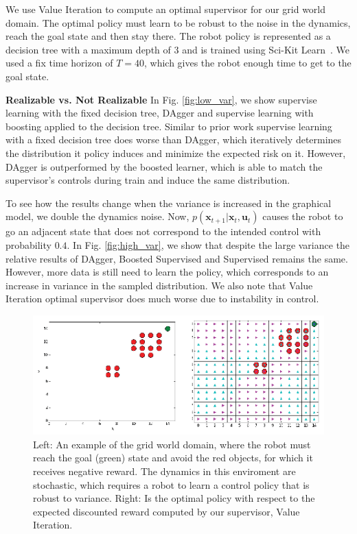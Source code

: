 \documentclass[10pt, conference]{ieeeconf}      %
\newcommand{\bu}{\mathbf{u}}
\newcommand{\bx}{\mathbf{x}}
\begin{document}
We use Value Iteration to compute an optimal supervisor for our grid world domain. The optimal policy must learn to be robust to the noise in the dynamics, reach the goal state and then stay there. The robot policy is represented as a decision tree with a maximum depth of $3$ and is trained using Sci-Kit Learn~\cite{scikit-learn}. We used a fix time horizon of $T=40$, which gives the robot enough time to get to the goal state. 


\noindent \textbf{Realizable vs. Not Realizable} In Fig. \ref{fig:low_var}, we show supervise learning with the fixed decision tree, DAgger and supervise learning with boosting applied to the decision tree. Similar to prior work supervise learning with a fixed decision tree does worse than DAgger, which iteratively determines the distribution it policy induces and minimize the expected risk on it. However, DAgger is outperformed by the boosted learner, which is able to match the supervisor's controls during train and induce the same distribution. 

To see how the results change when the variance is increased in the graphical model, we double the dynamics noise. Now, $p(\bx_{t+1}|\bx_t,\bu_t)$ causes the robot to go an adjacent state that does not correspond to the intended control with probability $0.4$. In Fig. \ref{fig:high_var}, we show that despite the large variance the relative results of DAgger, Boosted Supervised and Supervised remains the same. However, more data is still need to learn the policy, which corresponds to an increase in variance in the sampled distribution. We also note that Value Iteration optimal supervisor does much worse due to instability in control. 

\begin{figure}
\centering
\includegraphics{f_figs/grid_world.eps}
\caption{
    \footnotesize
Left: An example of the grid world domain, where the robot must reach the goal (green) state and avoid the red objects, for which it receives negative reward. The dynamics in this enviroment are stochastic, which requires a robot to learn a control policy that is robust to variance. Right: Is the optimal policy with respect to the expected discounted reward computed by our supervisor, Value Iteration.  }
\vspace*{-10pt}
\label{fig:grid_world}
\end{figure}
\end{document}

